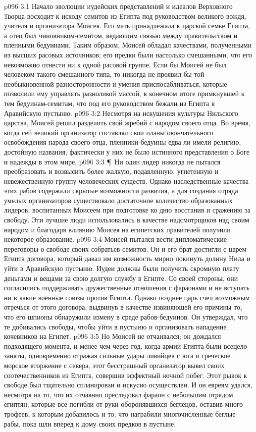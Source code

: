 \vs p096 3:1 Начало эволюции иудейских представлений и идеалов Верховного Творца восходит к исходу семитов из Египта под руководством великого вождя, учителя и организатора Моисея. Его мать принадлежала к царской семье Египта, а отец был чиновником\hyp{}семитом, ведающим связью между правительством и пленными бедуинами. Таким образом, Моисей обладал качествами, полученными из высших расовых источников; его предки были настолько смешанными, что его невозможно отнести ни к одной расовой группе. Если бы Моисей не был человеком такого смешанного типа, то никогда не проявил бы той необыкновенной разносторонности и умения приспосабливаться, которые позволили ему управлять разноликой массой, в конечном итоге примкнувшей к тем бедуинам\hyp{}семитам, что под его руководством бежали из Египта в Аравийскую пустыню.
\vs p096 3:2 Несмотря на искушения культуры Нильского царства, Моисей решил разделить свой жребий с народом своего отца. Во время, когда сей великий организатор составлял свои планы окончательного освобождения народа своего отца, пленники\hyp{}бедуины едва ли имели религию, достойную названия; фактически у них не было истинного представления о Боге и надежды в этом мире.
\vs p096 3:3 \P\ Ни один лидер никогда не пытался преобразовать и возвысить более жалкую, подавленную, угнетенную и невежественную группу человеческих существ. Однако наследственные качества этих рабов содержали скрытые возможности развития, а для создания отряда умелых организаторов существовало достаточное количество образованных лидеров, воспитанных Моисеем при подготовке ко дню восстания и сражению за свободу. Эти лучшие люди использовались в качестве надсмотрщиков над своим народом и благодаря влиянию Моисея на египетских правителей получили некоторое образование.
\vs p096 3:4 Моисей пытался вести дипломатические переговоры о свободе своих собратьев\hyp{}семитов. Он и его брат достигли с царем Египта договора, который давал им возможность мирно покинуть долину Нила и уйти в Аравийскую пустыню. Иудеи должны были получить скромную плату деньгами и вещами за свою долгую службу в Египте. Со своей стороны, они согласились поддерживать дружественные отношения с фараонами и не вступать ни в какие военные союзы против Египта. Однако позднее царь счел возможным отречься от этого договора, выдвинув в качестве извиняющей его причины то, что его шпионы обнаружили измену в среде рабов\hyp{}бедуинов. Он утверждал, что те добивались свободы, чтобы уйти в пустыню и организовать нападение кочевников на Египет.
\vs p096 3:5 Но Моисей не отчаивался; он дождался подходящего момента, и менее чем через год, когда армии Египта были всецело заняты, одновременно отражая сильные удары ливийцев с юга и греческое морское вторжение с севера, этот бесстрашный организатор вывел своих соотечественников из Египта, совершив эффектный ночной побег. Этот рывок к свободе был тщательно спланирован и искусно осуществлен. И он евреям удался, несмотря на то, что их отчаянно преследовал фараон с небольшим отрядом египтян, которые все погибли от руки оборонявшихся беглецов, оставив много трофеев, к которым добавилось и то, что награбили многочисленные беглые рабы, пока шли вперед к дому своих предков в пустыне.
